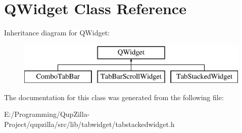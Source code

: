 \hypertarget{class_q_widget}{
\section{QWidget Class Reference}
\label{class_q_widget}
}
Inheritance diagram for QWidget:\begin{figure}[H]
\begin{center}
\leavevmode
\includegraphics[height=2cm]{class_q_widget}
\end{center}
\end{figure}


The documentation for this class was generated from the following file:\begin{DoxyCompactItemize}
\item 
E:/Programming/QupZilla-\/Project/qupzilla/src/lib/tabwidget/tabstackedwidget.h\end{DoxyCompactItemize}
